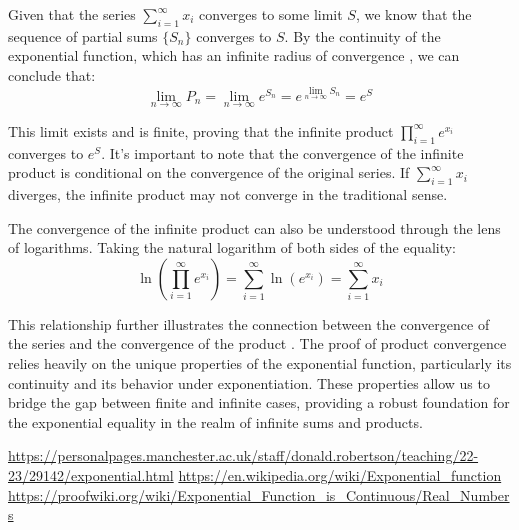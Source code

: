 \documentclass{article}
\begin{document}
Given that the series $\sum_{i=1}^\infty x_i$ converges to some limit $S$, we know that the sequence of partial sums $\{S_n\}$ converges to $S$. By the continuity of the exponential function, which has an infinite radius of convergence \cite{source1}, we can conclude that:
\[
\lim_{n\to \infty} P_n = \lim_{n\to \infty} e^{S_n} = e^{\lim_{n\to \infty} S_n} = e^S
\]

This limit exists and is finite, proving that the infinite product $\prod_{i=1}^\infty e^{x_i}$ converges to $e^S$. It's important to note that the convergence of the infinite product is conditional on the convergence of the original series. If $\sum_{i=1}^\infty x_i$ diverges, the infinite product may not converge in the traditional sense.

The convergence of the infinite product can also be understood through the lens of logarithms. Taking the natural logarithm of both sides of the equality:
\[
\ln\left(\prod_{i=1}^\infty e^{x_i}\right) = \sum_{i=1}^\infty \ln(e^{x_i}) = \sum_{i=1}^\infty x_i
\]

This relationship further illustrates the connection between the convergence of the series and the convergence of the product \cite{source2}. The proof of product convergence relies heavily on the unique properties of the exponential function, particularly its continuity and its behavior under exponentiation. These properties allow us to bridge the gap between finite and infinite cases, providing a robust foundation for the exponential equality in the realm of infinite sums and products.

\begin{thebibliography}{3}
 \url{https://personalpages.manchester.ac.uk/staff/donald.robertson/teaching/22-23/29142/exponential.html}
 \url{https://en.wikipedia.org/wiki/Exponential_function}
 \url{https://proofwiki.org/wiki/Exponential_Function_is_Continuous/Real_Numbers}
\end{thebibliography}
\end{document}
